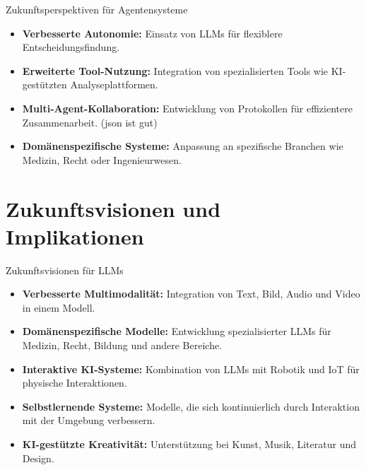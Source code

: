 \documentclass[aspectratio=1610, xcolor=dvipsnames, 9pt]{beamer}
\begin{document}
\begin{frame}{Zukunftsperspektiven für Agentensysteme}
  \begin{itemize}
    \item \textbf{Verbesserte Autonomie:} Einsatz von LLMs für flexiblere Entscheidungsfindung.
    \item \textbf{Erweiterte Tool-Nutzung:} Integration von spezialisierten Tools wie KI-gestützten Analyseplattformen.
    \item \textbf{Multi-Agent-Kollaboration:} Entwicklung von Protokollen für effizientere Zusammenarbeit. (json ist gut)
    \item \textbf{Domänenspezifische Systeme:} Anpassung an spezifische Branchen wie Medizin, Recht oder Ingenieurwesen.
  \end{itemize}
\end{frame}

\section{Zukunftsvisionen und Implikationen}

\begin{frame}{Zukunftsvisionen für LLMs}
  \begin{itemize}
    \item \textbf{Verbesserte Multimodalität:} Integration von Text, Bild, Audio und Video in einem Modell.
    \item \textbf{Domänenspezifische Modelle:} Entwicklung spezialisierter LLMs für Medizin, Recht, Bildung und andere Bereiche.
    \item \textbf{Interaktive KI-Systeme:} Kombination von LLMs mit Robotik und IoT für physische Interaktionen.
    \item \textbf{Selbstlernende Systeme:} Modelle, die sich kontinuierlich durch Interaktion mit der Umgebung verbessern.
    \item \textbf{KI-gestützte Kreativität:} Unterstützung bei Kunst, Musik, Literatur und Design.
  \end{itemize}
\end{frame}
\end{document}

